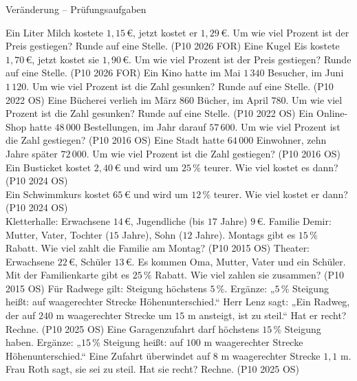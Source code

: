 \begin{aufgabe}{Veränderung – Prüfungsaufgaben}
\begin{teile}
\teil Ein Liter Milch kostete $1{,}15\,€$, jetzt kostet er $1{,}29\,€$. Um wie viel Prozent ist der Preis gestiegen? Runde auf eine Stelle. \hfill (P10 2026 FOR)
\teil Eine Kugel Eis kostete $1{,}70\,€$, jetzt kostet sie $1{,}90\,€$. Um wie viel Prozent ist der Preis gestiegen? Runde auf eine Stelle. \hfill (P10 2026 FOR)
\teil Ein Kino hatte im Mai $1\,340$ Besucher, im Juni $1\,120$. Um wie viel Prozent ist die Zahl gesunken? Runde auf eine Stelle. \hfill (P10 2022 OS)
\teil Eine Bücherei verlieh im März $860$ Bücher, im April $780$. Um wie viel Prozent ist die Zahl gesunken? Runde auf eine Stelle. \hfill (P10 2022 OS)
\teil Ein Online-Shop hatte $48\,000$ Bestellungen, im Jahr darauf $57\,600$. Um wie viel Prozent ist die Zahl gestiegen? \hfill (P10 2016 OS)
\teil Eine Stadt hatte $64\,000$ Einwohner, zehn Jahre später $72\,000$. Um wie viel Prozent ist die Zahl gestiegen? \hfill (P10 2016 OS)
\teil Ein Busticket kostet $2{,}40\,€$ und wird um $25\,\%$ teurer. Wie viel kostet es dann? \hfill (P10 2024 OS) \\ \leerfeld[€]
\teil Ein Schwimmkurs kostet $65\,€$ und wird um $12\,\%$ teurer. Wie viel kostet er dann? \hfill (P10 2024 OS) \\ \leerfeld[€]
\teil Kletterhalle: Erwachsene $14\,€$, Jugendliche (bis $17$ Jahre) $9\,€$. Familie Demir: Mutter, Vater, Tochter ($15$ Jahre), Sohn ($12$ Jahre). Montags gibt es $15\,\%$ Rabatt. Wie viel zahlt die Familie am Montag? \hfill (P10 2015 OS)
\teil Theater: Erwachsene $22\,€$, Schüler $13\,€$. Es kommen Oma, Mutter, Vater und ein Schüler. Mit der Familienkarte gibt es $25\,\%$ Rabatt. Wie viel zahlen sie zusammen? \hfill (P10 2015 OS)
\teil Für Radwege gilt: Steigung höchstens $5\,\%$. Ergänze: „$5\,\%$ Steigung heißt: auf \leerfeld[m] waagerechter Strecke \leerfeld[m] Höhenunterschied.“ Herr Lenz sagt: „Ein Radweg, der auf $240$ m waagerechter Strecke um $15$ m ansteigt, ist zu steil.“ Hat er recht? Rechne. \hfill (P10 2025 OS)
\teil Eine Garagenzufahrt darf höchstens $15\,\%$ Steigung haben. Ergänze: „$15\,\%$ Steigung heißt: auf $100$ m waagerechter Strecke \leerfeld[m] Höhenunterschied.“ Eine Zufahrt überwindet auf $8$ m waagerechter Strecke $1{,}1$ m. Frau Roth sagt, sie sei zu steil. Hat sie recht? Rechne. \hfill (P10 2025 OS)
\end{teile}
\end{aufgabe}
